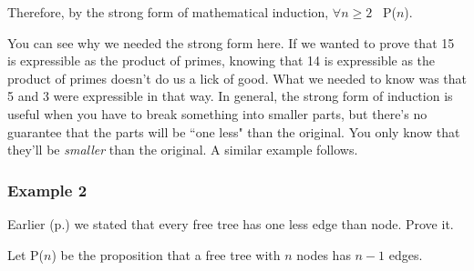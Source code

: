 Therefore, by the strong form of mathematical induction, $\forall n \geq 2$
\ P($n$).

You can see why we needed the strong form here. If we wanted to prove that
15 is expressible as the product of primes, knowing that 14 is expressible
as the product of primes doesn't do us a lick of good. What we needed to
know was that 5 and 3 were expressible in that way. In general, the strong
form of induction is useful when you have to break something into smaller
parts, but there's no guarantee that the parts will be ``one less" than the
original. You only know that they'll be \textit{smaller} than the original.
A similar example follows.

\subsubsection{Example 2}

Earlier (p.\pageref{onelessedge}) we stated that every free tree has one less
edge than node. Prove it.

Let P($n$) be the proposition that a free tree with $n$ nodes has $n-1$
edges.


